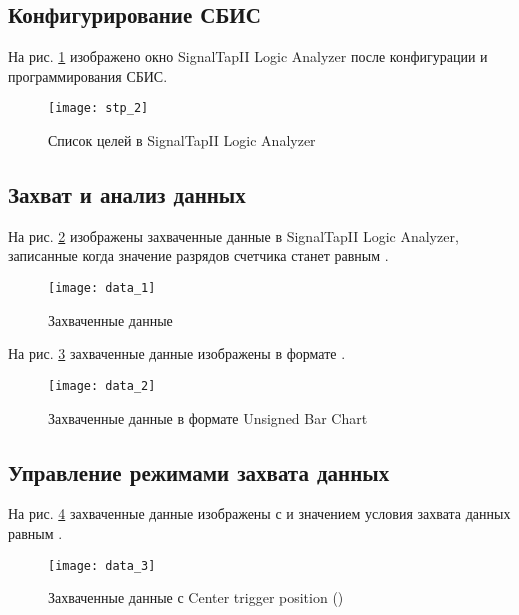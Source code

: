 \subsection{Конфигурирование СБИС}

На рис. \ref{fig:stp_2} изображено окно SignalTapII Logic Analyzer после конфигурации и программирования СБИС.

\begin{figure}[H]
	\begin{center}
		\texttt{[image: stp\_2]}
		\caption{Список целей в SignalTapII Logic Analyzer}
		\label{fig:stp_2}
	\end{center}
\end{figure}

\subsection{Захват и анализ данных}

На рис. \ref{fig:data_1} изображены захваченные данные в SignalTapII Logic Analyzer, записанные когда значение разрядов счетчика  станет равным .

\begin{figure}[H]
	\begin{center}
		\texttt{[image: data\_1]}
		\caption{Захваченные данные}
		\label{fig:data_1}
	\end{center}
\end{figure}

На рис. \ref{fig:data_2} захваченные данные изображены в формате .

\begin{figure}[H]
	\begin{center}
		\texttt{[image: data\_2]}
		\caption{Захваченные данные в формате Unsigned Bar Chart}
		\label{fig:data_2}
	\end{center}
\end{figure}

\subsection{Управление режимами захвата данных}

На рис. \ref{fig:data_3} захваченные данные изображены с  и значением условия захвата данных равным .

\vspace{-0.5cm}
\begin{figure}[H]
	\begin{center}
		\texttt{[image: data\_3]}
		\caption{Захваченные данные с Center trigger position ()}
		\label{fig:data_3}
	\end{center}
\end{figure}


